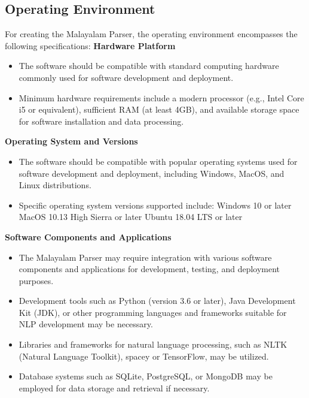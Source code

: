 \documentclass[12pt,a4paper,titlepage]{report}
\begin{document}
    \subsection{Operating Environment}
    For creating the Malayalam Parser, the operating environment encompasses the following specifications:
    \newline
    \textbf{Hardware Platform}
    \begin{itemize}
    	\item The software should be compatible with standard computing hardware commonly used for
    	software development and deployment.
    	\item Minimum hardware requirements include a modern processor (e.g., Intel Core i5 or equivalent),
    	sufficient RAM (at least 4GB), and available storage space for software installation and data
    	processing.
    \end{itemize}
    \textbf{Operating System and Versions}
    \begin{itemize}
    	\item The software should be compatible with popular operating systems used for software development
    	and deployment, including Windows, MacOS, and Linux distributions.
    	\item Specific operating system versions supported include:
    	\newline
    	Windows 10 or later
    	\newline
    	MacOS 10.13 High Sierra or later
    	\newline
    	Ubuntu 18.04 LTS or later
    \end{itemize}
    \textbf{Software Components and Applications}
    \begin{itemize}
    	\item The Malayalam Parser may require integration with various software components and applications
    	for development, testing, and deployment purposes.
    	\item Development tools such as Python (version 3.6 or later), Java Development Kit (JDK),
    	or other programming languages and frameworks suitable for NLP development may be
    	necessary.
    	\item Libraries and frameworks for natural language processing, such as NLTK (Natural Language
    	Toolkit), spacey or TensorFlow, may be utilized.
    	\item Database systems such as SQLite, PostgreSQL, or MongoDB may be employed for data
    	storage and retrieval if necessary.
    \end{itemize}
	
\end{document}
